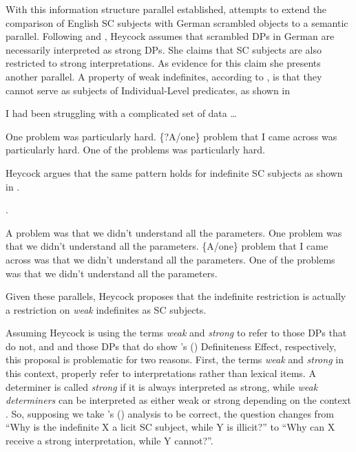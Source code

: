 \documentclass[
	letterpaper,
]{article}
\begin{document}
With this information structure parallel established, \textcite{heycock2012specification} attempts to extend the comparison of English SC subjects with German scrambled objects to a semantic parallel.
Following \textcite{dehoop1992case} and \textcite{diesing1992indefinites}, Heycock assumes that scrambled DPs in German are necessarily interpreted as strong DPs.
She claims that SC subjects are also restricted to strong interpretations.
As evidence for this claim she presents another parallel.
A property of weak indefinites, according to \textcite{milsark1974existential}, is that they cannot serve as subjects of Individual-Level predicates, as shown in \Next
\begin{exe}
\ex I had been struggling with a complicated set of data \ldots
\begin{xlist}
	\ex One problem was particularly hard.
	\ex \{?A/one\} problem that I came across was particularly hard.
	\ex One of the problems was particularly hard.\hfill\parencite{heycock2012specification}
\end{xlist}
\end{exe}
Heycock argues that the same pattern holds for indefinite SC subjects as shown in \Next.
\begin{exe}
\ex.
\begin{xlist}
	\ex[?*] A problem was that we didn't understand all the parameters.
	\ex One problem was that we didn't understand all the parameters.
	\ex \{A/one\} problem that I came across was that we didn't understand all the parameters.
	\ex One of the problems was that we didn't understand all the parameters.\hfill\parencite{heycock2012specification}	
\end{xlist}
\end{exe}
Given these parallels, Heycock proposes that the indefinite restriction is actually a restriction on \textit{weak} indefinites as SC subjects.

Assuming Heycock is using the terms \textit{weak} and \textit{strong} to refer to those DPs that do not, and and those DPs that do show \citeauthor{milsark1974existential}'s (\citeyear{milsark1974existential}) Definiteness Effect, respectively, 
this proposal is problematic for two reasons.
First, the terms \textit{weak} and \textit{strong} in this context, properly refer to interpretations rather than lexical items.
A determiner is called \textit{strong} if it is always interpreted as strong, while \textit{weak determiners} can be interpreted as either weak or strong depending on the context \parencite{diesing1992indefinites}.
So, supposing we take \citeauthor{heycock2012specification}'s (\citeyear{heycock2012specification}) analysis to be correct, the question changes from ``Why is the indefinite X a licit SC subject, while Y is illicit?'' to ``Why can X receive a strong interpretation, while Y cannot?''.
\end{document}
